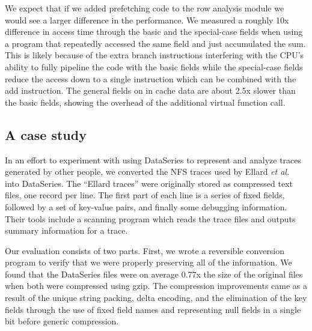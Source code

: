 \documentclass{acm_proc_article-sp}
\begin{document}
We
expect that if we added prefetching code to the row analysis module we
would see a larger difference in the performance. 
We measured a
roughly 10x difference in access time through the basic and the
special-case fields when using a program that repeatedly accessed the
same field and just accumulated the sum.  This is likely because of
the extra branch instructions interfering with the CPU's ability to
fully pipeline the code with the basic fields while the special-case
fields reduce the access down to a single instruction which can be
combined with the add instruction.  The general fields on in cache
data are about 2.5x slower than the basic fields, showing the overhead
of the additional virtual function call.

\subsection{A case study}\label{sec:ellard}

In an effort to experiment with using DataSeries to represent and
analyze traces generated by other people, we converted the NFS
traces used by Ellard \textit{et al.}~\cite{ellard03} into DataSeries.  
The ``Ellard traces''
were originally stored as compressed text files, one record per line.
The first part of each line is a series of fixed fields, followed by a
set of key-value pairs, and finally some debugging information.  
Their tools include a scanning program which reads the
trace files and outputs summary information for a trace.

Our evaluation consists of two parts.
First, we wrote a reversible conversion program to
verify that we were properly preserving all of the information.
We found that the DataSeries files were on average 0.77x the size of
the original files when both were compressed using gzip.  The
compression improvements came as a result of the unique string
packing, delta encoding, and the elimination of the key fields through
the use of fixed field names and representing null fields in a single
bit before generic compression.

\end{document}
